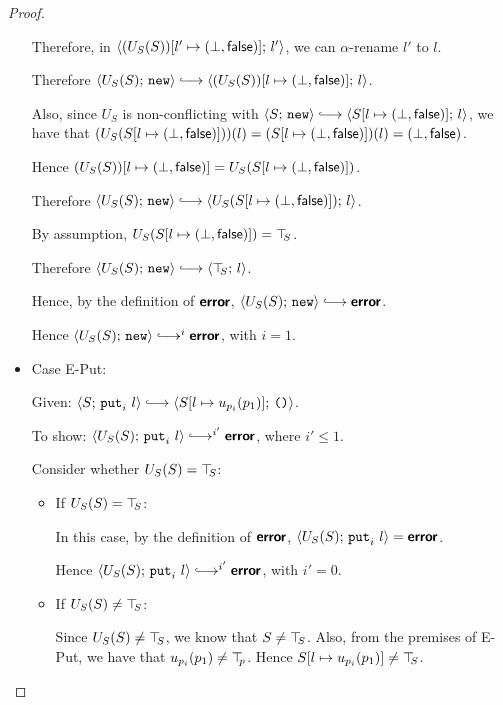 \begin{proof}
\begin{itemize}
    Therefore, in
    $\langle (U_S(S))[l' \mapsto (\bot, \textsf{false})];\, l' \rangle$, we
    can $\alpha$-rename $l'$ to $l$.

    Therefore $\config{U_S(S)}{\NEW} \parstepsto
    \config{\extS{(U_S(S))}{l}{\bot}{\frozenfalse}}{l}$.

    Also, since $U_S$ is non-conflicting with $\config{S}{\NEW}
    \parstepsto \config{\extS{S}{l}{\bot}{\frozenfalse}}{l}$, we
    have that $(U_S(S[l \mapsto (\bot, \textsf{false})]))(l) =
    (S[l \mapsto (\bot, \textsf{false})])(l) =
    (\bot, \textsf{false})$.

    Hence $(U_S(S))[l \mapsto (\bot, \textsf{false})] =
    U_S(S[l \mapsto (\bot, \textsf{false})])$.

    Therefore $\config{U_S(S)}{\NEW} \parstepsto
    \config{U_S(\extS{S}{l}{\bot}{\frozenfalse})}{l}$.

    By assumption, $U_S(S[l \mapsto (\bot, \textsf{false})]) = \top\hspace{-0.85mm}_{S}$.

    Therefore $\config{U_S(S)}{\NEW} \parstepsto \config{\topS}{l}$.

    Hence, by the definition of $\textbf{\textsf{error}}$, $\config{U_S(S)}{\NEW}
    \parstepsto \error$.

    Hence $\config{U_S(S)}{\NEW} \parstepsto^i \error$, with $i = 1$.

  \item Case {\sc E-Put}:

    Given: $\config{S}{\putiexp{l}} \parstepsto
    \config{\extSRaw{S}{l}{u_{p_i}(p_1)}}{\unit}$.

    To show: $\config{U_S(S)}{\putiexp{l}} \parstepsto^{i'} \error$,
    where $i' \leq 1$.

    Consider whether $U_S(S) = \top\hspace{-0.85mm}_{S}$:
    \begin{itemize}

      \item If $U_S(S) = \top\hspace{-0.85mm}_{S}$:

        In this case, by the definition of $\textbf{\textsf{error}}$,
        $\langle U_S(S);\, \mbox{\texttt{put}}_i~l \rangle = \textbf{\textsf{error}}$.

        Hence $\config{U_S(S)}{\putiexp{l}}
        \parstepsto^{i'} \error$, with $i' = 0$.

      \item If $U_S(S) \neq \top\hspace{-0.85mm}_{S}$:

        Since $U_S(S) \neq \top\hspace{-0.85mm}_{S}$, we know that $S \neq \top\hspace{-0.85mm}_{S}$.  Also,
        from the premises of {\sc E-Put}, we have that $u_{p_i}(p_1)
        \neq \top\hspace{-0.85mm}_{p}$.  Hence $S[l \mapsto u_{p_i}(p_1)] \neq \top\hspace{-0.85mm}_{S}$.


\end{itemize}
\end{itemize}
\end{proof}
